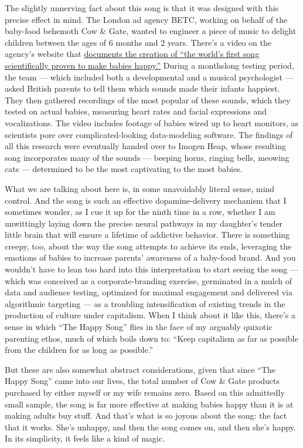 The slightly unnerving fact about this song is that it was designed with
this precise effect in mind. The London ad agency BETC, working on
behalf of the baby-food behemoth Cow \& Gate, wanted to engineer a piece
of music to delight children between the ages of 6 months and 2 years.
There's a video on the agency's website that
\href{http://www.betc.co.uk/the-sound-of-happiness}{documents the
creation of ``the world's first song scientifically proven to make
babies happy.''} During a monthslong testing period, the team --- which
included both a developmental and a musical psychologist --- asked
British parents to tell them which sounds made their infants happiest.
They then gathered recordings of the most popular of these sounds, which
they tested on actual babies, measuring heart rates and facial
expressions and vocalizations. The video includes footage of babies
wired up to heart monitors, as scientists pore over complicated-looking
data-modeling software. The findings of all this research were
eventually handed over to Imogen Heap, whose resulting song incorporates
many of the sounds --- beeping horns, ringing bells, meowing cats ---
determined to be the most captivating to the most babies.

What we are talking about here is, in some unavoidably literal sense,
mind control. And the song is such an effective dopamine-delivery
mechanism that I sometimes wonder, as I cue it up for the ninth time in
a row, whether I am unwittingly laying down the precise neural pathways
in my daughter's tender little brain that will ensure a lifetime of
addictive behavior. There is something creepy, too, about the way the
song attempts to achieve its ends, leveraging the emotions of babies to
increase parents' awareness of a baby-food brand. And you wouldn't have
to lean too hard into this interpretation to start seeing the song ---
which was conceived as a corporate-branding exercise, germinated in a
mulch of data and audience testing, optimized for maximal engagement and
delivered via algorithmic targeting --- as a troubling intensification
of existing trends in the production of culture under capitalism. When I
think about it like this, there's a sense in which ``The Happy Song''
flies in the face of my arguably quixotic parenting ethos, much of which
boils down to: ``Keep capitalism as far as possible from the children
for as long as possible.''

But these are also somewhat abstract considerations, given that since
``The Happy Song'' came into our lives, the total number of Cow \& Gate
products purchased by either myself or my wife remains zero. Based on
this admittedly small sample, the song is far more effective at making
babies happy than it is at making adults buy stuff. And that's what is
so joyous about the song: the fact that it works. She's unhappy, and
then the song comes on, and then she's happy. In its simplicity, it
feels like a kind of magic.

